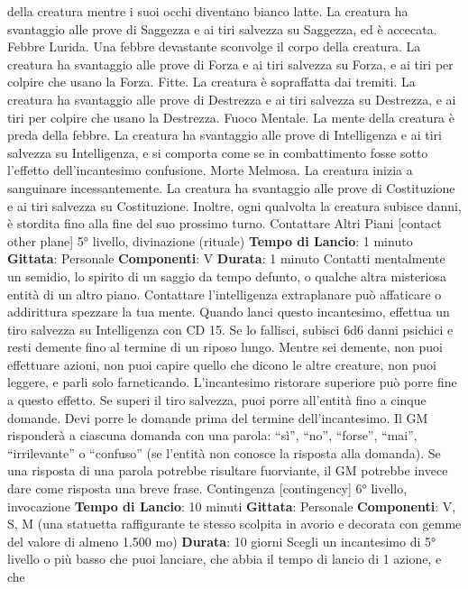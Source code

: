 \begin{multicols}{2}
della creatura mentre i suoi occhi diventano bianco
latte. La creatura ha svantaggio alle prove di Saggezza
e ai tiri salvezza su Saggezza, ed è accecata.
Febbre Lurida. Una febbre devastante sconvolge il
corpo della creatura. La creatura ha svantaggio alle
prove di Forza e ai tiri salvezza su Forza, e ai tiri per
colpire che usano la Forza.
Fitte. La creatura è sopraffatta dai tremiti. La creatura
ha svantaggio alle prove di Destrezza e ai tiri salvezza
su Destrezza, e ai tiri per colpire che usano la
Destrezza.
Fuoco Mentale. La mente della creatura è preda della
febbre. La creatura ha svantaggio alle prove di
Intelligenza e ai tiri salvezza su Intelligenza, e si
comporta come se in combattimento fosse sotto l’effetto
dell’incantesimo confusione.
Morte Melmosa. La creatura inizia a sanguinare
incessantemente. La creatura ha svantaggio alle prove
di Costituzione e ai tiri salvezza su Costituzione. Inoltre,
ogni qualvolta la creatura subisce danni, è stordita fino
alla fine del suo prossimo turno.
Contattare Altri Piani
[contact other plane]
5° livello, divinazione (rituale)
\textbf{Tempo di Lancio}: 1 minuto
\textbf{Gittata}: Personale
\textbf{Componenti}: V
\textbf{Durata}: 1 minuto
Contatti mentalmente un semidio, lo spirito di un saggio
da tempo defunto, o qualche altra misteriosa entità di
un altro piano. Contattare l’intelligenza extraplanare può
affaticare o addirittura spezzare la tua mente. Quando
lanci questo incantesimo, effettua un tiro salvezza su
Intelligenza con CD 15. Se lo fallisci, subisci 6d6 danni
psichici e resti demente fino al termine di un riposo
lungo. Mentre sei demente, non puoi effettuare azioni,
non puoi capire quello che dicono le altre creature, non
puoi leggere, e parli solo farneticando. L’incantesimo
ristorare superiore può porre fine a questo effetto.
Se superi il tiro salvezza, puoi porre all’entità fino a
cinque domande. Devi porre le domande prima del
termine dell’incantesimo. Il GM risponderà a ciascuna
domanda con una parola: “sì”, “no”, “forse”, “mai”,
“irrilevante” o “confuso” (se l’entità non conosce la
risposta alla domanda). Se una risposta di una parola
potrebbe risultare fuorviante, il GM potrebbe invece
dare come risposta una breve frase.
Contingenza
[contingency]
6° livello, invocazione
\textbf{Tempo di Lancio}: 10 minuti
\textbf{Gittata}: Personale
\textbf{Componenti}: V, S, M (una statuetta raffigurante te
stesso scolpita in avorio e decorata con gemme del
valore di almeno 1.500 mo)
\textbf{Durata}: 10 giorni
Scegli un incantesimo di 5° livello o più basso che puoi
lanciare, che abbia il tempo di lancio di 1 azione, e che

\end{multicols}
